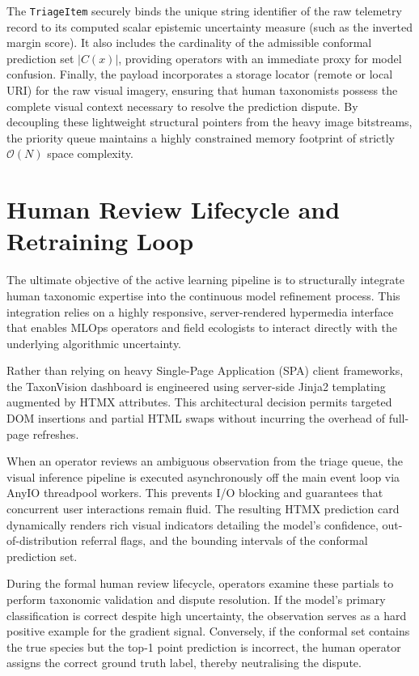 The \texttt{TriageItem} securely binds the unique string identifier of the raw telemetry record to its computed scalar epistemic uncertainty measure (such as the inverted margin score). It also includes the cardinality of the admissible conformal prediction set $|C(x)|$, providing operators with an immediate proxy for model confusion. Finally, the payload incorporates a storage locator (remote or local URI) for the raw visual imagery, ensuring that human taxonomists possess the complete visual context necessary to resolve the prediction dispute. By decoupling these lightweight structural pointers from the heavy image bitstreams, the priority queue maintains a highly constrained memory footprint of strictly $\mathcal{O}(N)$ space complexity.

\section{Human Review Lifecycle and Retraining Loop}
\label{sec:review_lifecycle}

The ultimate objective of the active learning pipeline is to structurally integrate human taxonomic expertise into the continuous model refinement process. This integration relies on a highly responsive, server-rendered hypermedia interface that enables MLOps operators and field ecologists to interact directly with the underlying algorithmic uncertainty.

Rather than relying on heavy Single-Page Application (SPA) client frameworks, the TaxonVision dashboard is engineered using server-side Jinja2 templating augmented by HTMX attributes. This architectural decision permits targeted DOM insertions and partial HTML swaps without incurring the overhead of full-page refreshes.

When an operator reviews an ambiguous observation from the triage queue, the visual inference pipeline is executed asynchronously off the main event loop via AnyIO threadpool workers. This prevents I/O blocking and guarantees that concurrent user interactions remain fluid. The resulting HTMX prediction card dynamically renders rich visual indicators detailing the model's confidence, out-of-distribution referral flags, and the bounding intervals of the conformal prediction set.

During the formal human review lifecycle, operators examine these partials to perform taxonomic validation and dispute resolution. If the model's primary classification is correct despite high uncertainty, the observation serves as a hard positive example for the gradient signal. Conversely, if the conformal set contains the true species but the top-1 point prediction is incorrect, the human operator assigns the correct ground truth label, thereby neutralising the dispute.


